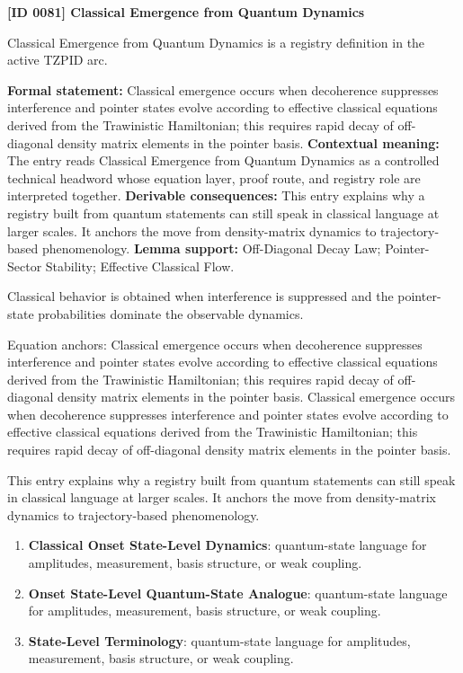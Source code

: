 \clearpage
\noindent\textbf{[ID 0081] Classical Emergence from Quantum Dynamics}\par
\vspace{0.35em}
\begingroup\small
{}
Classical Emergence from Quantum Dynamics is a registry definition in the active TZPID arc.

\begingroup\footnotesize\setlength{\emergencystretch}{3em}\sloppy
\textbf{Formal statement:} Classical emergence occurs when decoherence suppresses interference and pointer states evolve according to effective classical equations derived from the Trawinistic Hamiltonian; this requires rapid decay of off-diagonal density matrix elements in the pointer basis. \textbf{Contextual meaning:} The entry reads Classical Emergence from Quantum Dynamics as a controlled technical headword whose equation layer, proof route, and registry role are interpreted together. \textbf{Derivable consequences:} This entry explains why a registry built from quantum statements can still speak in classical language at larger scales. It anchors the move from density-matrix dynamics to trajectory-based phenomenology. \textbf{Lemma support:} Off-Diagonal Decay Law; Pointer-Sector Stability; Effective Classical Flow.\par
\endgroup

Classical behavior is obtained when interference is suppressed and the pointer-state probabilities dominate the observable dynamics.

Equation anchors: Classical emergence occurs when decoherence suppresses interference and pointer states evolve according to effective classical equations derived from the Trawinistic Hamiltonian; this requires rapid decay of off-diagonal density matrix elements in the pointer basis. Classical emergence occurs when decoherence suppresses interference and pointer states evolve according to effective classical equations derived from the Trawinistic Hamiltonian; this requires rapid decay of off-diagonal density matrix elements in the pointer basis.

This entry explains why a registry built from quantum statements can still speak in classical language at larger scales. It anchors the move from density-matrix dynamics to trajectory-based phenomenology.
\endgroup

\begingroup\footnotesize\sloppy
\begin{enumerate}[leftmargin=1.35em,itemsep=1pt,topsep=1pt,parsep=0pt]
\item \textbf{Classical Onset State-Level Dynamics}: quantum-state language for amplitudes, measurement, basis structure, or weak coupling.
\item \textbf{Onset State-Level Quantum-State Analogue}: quantum-state language for amplitudes, measurement, basis structure, or weak coupling.
\item \textbf{State-Level Terminology}: quantum-state language for amplitudes, measurement, basis structure, or weak coupling.
\end{enumerate}
\endgroup

